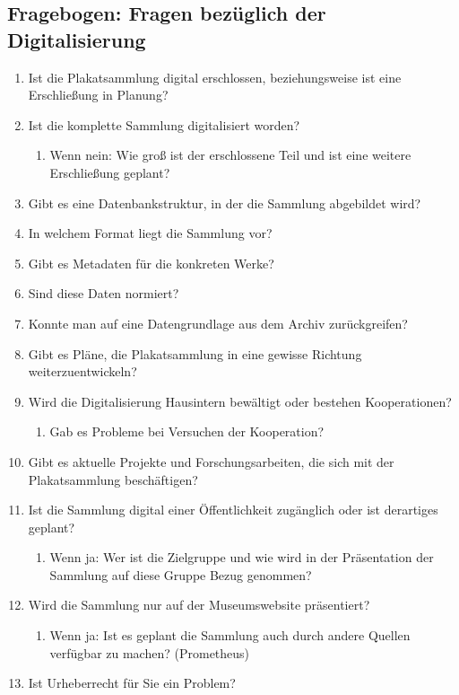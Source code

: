 \documentclass[a4paper,12pt,ngerman]{article}
\begin{document}
\subsection{Fragebogen: Fragen bezüglich der Digitalisierung}
\begin{enumerate}
\item Ist die Plakatsammlung digital erschlossen, beziehungsweise ist eine Erschließung in Planung?
\item Ist die komplette Sammlung digitalisiert worden?
\begin{enumerate}
\item Wenn nein: Wie groß ist der erschlossene Teil und ist eine weitere Erschließung geplant?
\end{enumerate}
\item Gibt es eine Datenbankstruktur, in der die Sammlung abgebildet wird?
\item In welchem Format liegt die Sammlung vor?
\item Gibt es Metadaten für die konkreten Werke?
\item Sind diese Daten normiert?
\item Konnte man auf eine Datengrundlage aus dem Archiv zurückgreifen?
\item Gibt es Pläne, die Plakatsammlung in eine gewisse Richtung weiterzuentwickeln?
\item Wird die Digitalisierung Hausintern bewältigt oder bestehen Kooperationen?
\begin{enumerate}
\item Gab es Probleme bei Versuchen der Kooperation?
\end{enumerate}
\item Gibt es aktuelle Projekte und Forschungsarbeiten, die sich mit der Plakatsammlung beschäftigen?
\item Ist die Sammlung digital einer Öffentlichkeit zugänglich oder ist derartiges geplant?
\begin{enumerate}
\item Wenn ja: Wer ist die Zielgruppe und wie wird in der Präsentation der Sammlung auf diese Gruppe Bezug genommen?
\end{enumerate}
\item Wird die Sammlung nur auf der Museumswebsite präsentiert?
\begin{enumerate}
\item Wenn ja: Ist es geplant die Sammlung auch durch andere Quellen verfügbar zu machen? (Prometheus)
\end{enumerate}
\item Ist Urheberrecht für Sie ein Problem?

\end{enumerate}
\end{document}
